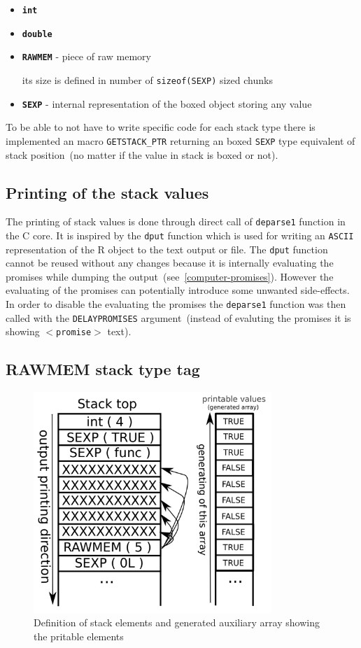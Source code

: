 \documentclass[thesis=M,english]{FITthesis}[2018/10/20]
\newcommand{\code}[1]{\texttt{#1}}
\begin{document}
\begin{itemize}
	\item \textbf{\code{int}}
	\item \textbf{\code{double}}
	\item \textbf{\code{RAWMEM}} - piece of raw memory

		its size is defined in number of \code{sizeof(SEXP)} sized  chunks
	\item \textbf{\code{SEXP}} - internal representation of the boxed object storing any value
\end{itemize}

To be able to not have to write specific code for each stack type there is implemented an macro \code{GETSTACK{\_}PTR} returning an boxed \code{SEXP} type equivalent of stack position~(no matter if the value in stack is boxed or not).

\subsection{Printing of the stack values}\label{printing-stack-values}

The printing of stack values is done through direct call of \code{deparse1} function in the C core. It is inspired by the \code{dput} function which is used for writing an \code{ASCII} representation of the R object to the text output or file. The \code{dput} function cannot be reused without any changes because it is internally evaluating the promises while dumping the output~(see~\ref{computer-promises}). However the evaluating of the promises can potentially introduce some unwanted side-effects. In order to disable the evaluating the promises the \code{deparse1} function was then called with the \code{DELAYPROMISES} argument~(instead of evaluting the promises it is showing \code{$<$promise$>$} text).

\subsection{RAWMEM stack type tag}

\begin{figure}[h!]
	\includegraphics[width=90mm]{stack-rawmem.png}
	\caption{Definition of stack elements and generated auxiliary array showing the pritable elements}\label{fig:stack-elements-definition}
\end{figure}
\end{document}
